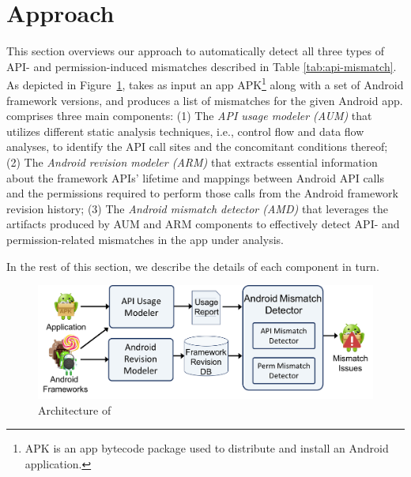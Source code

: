 
\section{Approach}\label{sec-approach}

This section overviews our approach to automatically detect all three types of API-
and permission-induced mismatches described in Table
\ref{tab:api-mismatch}.
As depicted in Figure~\ref{fig:arch},  \@approach takes as
input an app APK\footnote{APK is an app bytecode package used to distribute and install an Android application.} 
along with a set of Android framework
versions, and produces a list of mismatches for the given
Android app.  %
\@approach
comprises three main components:
(1) The \textit{API usage modeler (AUM)} that utilizes different static analysis techniques, i.e., control flow and data flow analyses, to  identify the API call sites and the concomitant conditions thereof;
(2) The \textit{Android revision modeler (ARM)} 
that extracts essential information about the framework APIs' lifetime and mappings between Android API calls and the permissions required to perform those calls
from the Android framework revision history;
(3) The \textit{Android mismatch detector (AMD)} that
leverages the artifacts produced by AUM and ARM components to effectively detect API- and permission-related mismatches in the app under analysis.

In the rest of this section, we describe the details of each component in turn.
 

\begin{figure}[t!]
    \centering
    \includegraphics[width=\linewidth]{images/Approach.png}
    \vspace{-0.2cm}    
    \caption{Architecture of \@approach}
    \label{fig:arch}
    \vspace{-0.3cm}
\end{figure}


